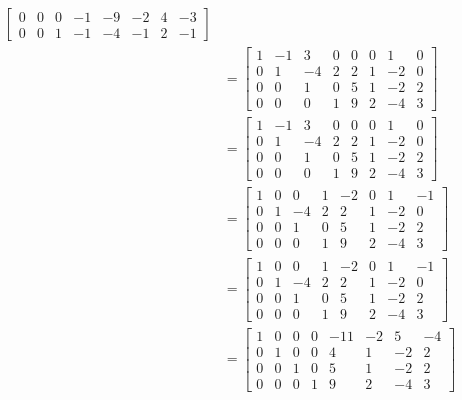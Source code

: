 \documentclass[letterpaper, 12pt]{math}
\begin{document}
\begin{align*}
\begin{bmatrix}
    0 & 0 & 0 & -1 & -9 & -2 & 4 & -3 \\
    0 & 0 & 1 & -1 & -4 & -1 & 2 & -1
  \end{bmatrix} \\
  &= \begin{bmatrix}
    1 & -1 & 3 & 0 & 0 & 0 & 1 & 0 \\
    0 & 1 & -4 & 2 & 2 & 1 & -2 & 0 \\
    0 & 0 & 1 & 0 & 5 & 1 & -2 & 2 \\
    0 & 0 & 0 & 1 & 9 & 2 & -4 & 3
  \end{bmatrix} \\
  &= \begin{bmatrix}
    1 & -1 & 3 & 0 & 0 & 0 & 1 & 0 \\
    0 & 1 & -4 & 2 & 2 & 1 & -2 & 0 \\
    0 & 0 & 1 & 0 & 5 & 1 & -2 & 2 \\
    0 & 0 & 0 & 1 & 9 & 2 & -4 & 3
  \end{bmatrix} \\
  &= \begin{bmatrix}
    1 & 0 & 0 & 1 & -2 & 0 & 1 & -1 \\
    0 & 1 & -4 & 2 & 2 & 1 & -2 & 0 \\
    0 & 0 & 1 & 0 & 5 & 1 & -2 & 2 \\
    0 & 0 & 0 & 1 & 9 & 2 & -4 & 3
  \end{bmatrix} \\
  &= \begin{bmatrix}
    1 & 0 & 0 & 1 & -2 & 0 & 1 & -1 \\
    0 & 1 & -4 & 2 & 2 & 1 & -2 & 0 \\
    0 & 0 & 1 & 0 & 5 & 1 & -2 & 2 \\
    0 & 0 & 0 & 1 & 9 & 2 & -4 & 3
  \end{bmatrix} \\
  &= \begin{bmatrix}
    1 & 0 & 0 & 0 & -11 & -2 & 5 & -4 \\
    0 & 1 & 0 & 0 & 4 & 1 & -2 & 2 \\
    0 & 0 & 1 & 0 & 5 & 1 & -2 & 2 \\
    0 & 0 & 0 & 1 & 9 & 2 & -4 & 3
  \end{bmatrix}
\end{align*}
\end{document}
